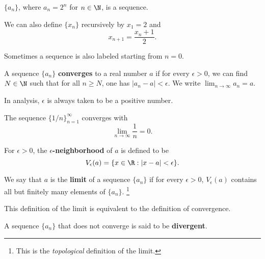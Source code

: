 \begin{example}
  $\{a_n\}$, where $a_n = 2^n$ for $n \in \N$, is a sequence.
\end{example}

\begin{example}
  We can also define $\{x_n\}$ recursively by $x_1 = 2$
  and
  \[
    x_{n+1} = \frac{x_n + 1}{2}
  .\]
\end{example}

\begin{remark}
  Sometimes a sequence is also labeled starting from
  $n = 0$.
\end{remark}

\begin{definition}
  A sequence $\{a_n\}$ \textbf{converges} to a real number
  $a$ if for every $\epsilon > 0$, we can find $N \in \N$
  such that for all $n \ge N$, one has
  $|a_n - a| < \epsilon$.
  We write $\lim_{n \to \infty} a_n = a$.
\end{definition}

\begin{remark}
  In analysis, $\epsilon$ is always taken to be a
  positive number.
\end{remark}

\begin{example}
  The sequence $\{1/n\}_{n = 1}^\infty$ converges with
  \[\lim_{n \to \infty} \frac{1}{n} = 0.\]
\end{example}

\begin{definition}
  For $\epsilon > 0$, the
  \textbf{$\epsilon$-neighborhood} of $a$
  is defined to be
  \[V_\epsilon(a) = \{x \in \R : |x - a| < \epsilon\}.\]
\end{definition}

\begin{definition}
  We say that $a$ is the \textbf{limit} of a sequence
  $\{a_n\}$ if for every $\epsilon > 0$,
  $V_\epsilon(a)$ contains all but finitely
  many elements of $\{a_n\}$.
  \footnote{This is the \textit{topological} definition
    of the limit.}
\end{definition}

\begin{remark}
  This definition of the limit is equivalent to the
  definition of convergence.
\end{remark}

\begin{definition}
  A sequence $\{a_n\}$ that does not converge is said
  to be \textbf{divergent}.
\end{definition}


